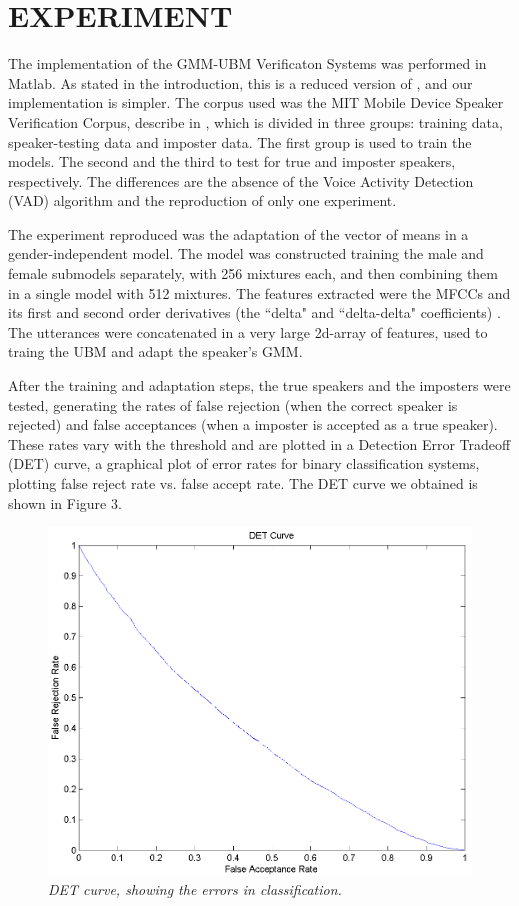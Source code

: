 \documentclass[a4paper,twocolumn]{article}
\begin{document}
\section{EXPERIMENT}

The implementation of the GMM-UBM Verificaton Systems was performed in Matlab. As stated in the introduction, this is a reduced version of \cite{reynolds_et_al_2000}, and our implementation is simpler. The corpus used was the MIT Mobile Device Speaker Verification Corpus, describe in \cite{corpus_paper}, which is divided in three groups: training data, speaker-testing data and imposter data. The first group is used to train the models. The second and the third to test for true and imposter speakers, respectively. The differences are the absence of the Voice Activity Detection (VAD) algorithm and the reproduction of only one experiment.

The experiment reproduced was the adaptation of the vector of means in a gender-independent model. The model was constructed training the male and female submodels separately, with 256 mixtures each, and then combining them in a single model with 512 mixtures. The features extracted were the MFCCs and its first and second order derivatives (the ``delta" and ``delta-delta" coefficients) \cite{pinheiro_2013}. The utterances were concatenated in a very large 2d-array of features, used to traing the UBM and adapt the speaker's GMM.

After the training and adaptation steps, the true speakers and the imposters were tested, generating the rates of false rejection (when the correct speaker is rejected) and false acceptances (when a imposter is accepted as a true speaker). These rates vary with the threshold and are plotted in a Detection Error Tradeoff (DET) curve, a graphical plot of error rates for binary classification systems, plotting false reject rate vs. false accept rate. The DET curve we obtained is shown in Figure 3.

\begin{figure}[h]
    \label{fig:det}
    \centering
    \includegraphics[scale=0.2]{det}
    \caption{\textit{DET curve, showing the errors in classification.}}
\end{figure}
\end{document}
